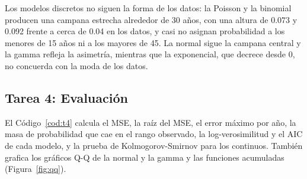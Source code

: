 \documentclass[11pt,letterpaper]{article}
\begin{document}
Los modelos discretos no siguen la forma de los datos: la Poisson y la binomial producen una campana estrecha alrededor de 30 años, con una altura de 0.073 y 0.092 frente a cerca de 0.04 en los datos, y casi no asignan probabilidad a los menores de 15 años ni a los mayores de 45. La normal sigue la campana central y la gamma refleja la asimetría, mientras que la exponencial, que decrece desde 0, no concuerda con la moda de los datos.

\subsection{Tarea 4: Evaluación}

El Código~\ref{cod:t4} calcula el MSE, la raíz del MSE, el error máximo por año, la masa de probabilidad que cae en el rango observado, la log-verosimilitud y el AIC de cada modelo, y la prueba de Kolmogorov-Smirnov para los continuos. También grafica los gráficos Q-Q de la normal y la gamma y las funciones acumuladas (Figura~\ref{fig:qq}).
\end{document}
